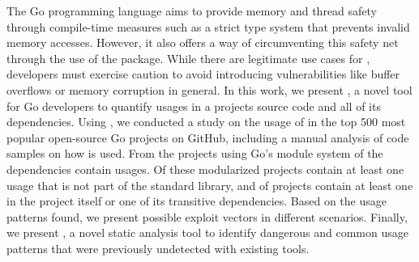 The Go programming language aims to provide memory and thread safety through compile-time measures such as a strict type system that prevents invalid memory accesses. 
However, it also offers a way of circumventing this safety net through the use of the \unsafe{} package.
While there are legitimate use cases for \unsafe{}, developers must exercise caution to avoid introducing vulnerabilities like buffer overflows or memory corruption in general.
In this work, we present \toolUsage{}, a novel tool for Go developers to quantify \unsafe{} usages in a projects source code and all of its dependencies.
Using \toolUsage{}, we conducted a study on the usage of \unsafe{} in the top 500 most popular open-source Go projects on GitHub, including a manual analysis of \numberCodeSnippets{} code samples on how \unsafe{} is used.
From the projects using Go's module system  \percentagePackagesWithUnsafe{} of the dependencies contain \unsafe{} usages. 
Of these modularized projects \percentageProjectsWithUnsafe{} contain at least one usage that is not part of the standard library, and \percentageProjectsAndDependenciesUnsafe{} of projects contain at least one \unsafe{} in the project itself or one of its transitive dependencies.
Based on the usage patterns found, we present possible exploit vectors in different scenarios. 
Finally, we present \toolSA{}, a novel static analysis tool to identify dangerous and common usage patterns that were previously undetected with existing tools.
